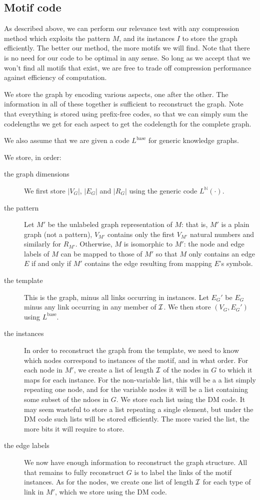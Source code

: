 \documentclass[11pt]{article}
\newcommand{\N}{{\mathbb N}}
\begin{document}
\subsection{Motif code}

As described above, we can perform our relevance test with any compression method which exploits the pattern $M$, and its instances $I$ to store the graph efficiently. The better our method, the more motifs we will find. Note that there is no need for our code to be optimal in any sense. So long as we accept that we won't find all motifs that exist, we are free to trade off compression performance against efficiency of computation.

We store the graph by encoding various aspects, one after the other. The information in all of these together is sufficient to reconstruct the graph. Note that everything is stored using prefix-free codes, so that we can simply sum the codelengths we get for each aspect to get the codelength for the complete graph.

We also assume that we are given a code $L^\text{base}$ for generic knowledge graphs.

We store, in order:

\begin{description}
 \item[the graph dimensions] We first store $|V_G|$, $|E_G|$ and $|R_G|$ using the generic code $L^{\N}(\cdot)$.
 \item[the pattern] Let $M'$ be the unlabeled graph representation of $M$: that is, $M'$ is a plain graph (not a pattern), $V_{M'}$ contains only the first $V_{M'}$ natural numbers and similarly for $R_{M'}$. Otherwise, $M$ is isomorphic to $M'$: the node and edge labels of $M$ can be mapped to those of $M'$ so that $M$ only contains an edge $E$ if and only if $M'$ contains the edge resulting from mapping $E$'s symbols. 
 \item[the template] This is the graph, minus all links occurring in  instances. Let $E_G'$ be $E_G$ minus any link occurring in any member of $\cal I$. We then store $(V_G, E_G')$ using $L^\text{base}$.
 \item[the instances] In order to reconstruct the graph from the template, we need to know which nodes correspond to instances of the motif, and in what order. For each node in $M'$, we create a list of length $\cal I$ of the nodes in $G$ to which it maps for each instance. For the non-variable list, this will be a a list simply repeating one node, and for the variable nodes it will be a list containing some subset of the ndoes in $G$.
 We store each list using the DM code. It may seem wasteful to store a list repeating a single element, but under the DM code such lists will be stored efficiently. The more varied the list, the more bits it will require to store.
 \item[the edge labels] We now have enough information to reconstruct the graph structure. All that remains to fully reconstruct $G$ is to label the links of the motif instances. As for the nodes, we create one list of length $\cal I$ for each type of link in $M'$, which we store using the DM code.
\end{description}
\end{document}
